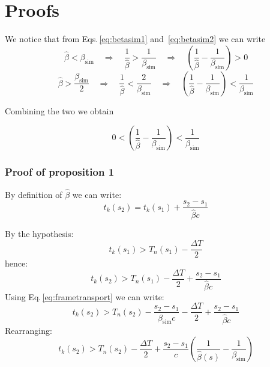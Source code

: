 \section{Proofs}
\label{seq:coasting_proofs}


We notice that from Eqs.\,\ref{eq:betasim1} and~\ref{eq:betasim2} we can write
\begin{equation}
\hat{\beta} < \beta_\text{sim} 
\quad \Rightarrow \quad
\frac{1}{\hat{\beta}} > \frac{1}{\beta_\text{sim}}
\quad \Rightarrow \quad
\left(
\frac{1}{\hat{\beta}} - \frac{1}{\beta_\text{sim}}
\right) > 0
\end{equation}
\begin{equation}
\hat{\beta} > \frac{\beta_\text{sim}}{2} 
\quad \Rightarrow \quad
\frac{1}{\hat{\beta}} < \frac{2}{\beta_\text{sim}}
\quad \Rightarrow \quad
\left(
\frac{1}{\hat{\beta}} - \frac{1}{\beta_\text{sim}}
\right) < \frac{1}{\beta_\text{sim}}
\end{equation}

Combining the two we obtain

\begin{equation}
0<\left(
\frac{1}{\hat{\beta}} - \frac{1}{\beta_\text{sim}}
\right) < \frac{1}{\beta_\text{sim}}
\label{eq:betaineq}
\end{equation}

\subsubsection*{Proof of proposition 1}
By definition of $\hat{\beta}$ we can write:
\begin{equation}
t_k(s_2) = t_k(s_1) + \frac{s_2 - s_1}{\hat{\beta} c} 
\label{eq:tk2fromtk1}
\end{equation}

By the hypothesis:
\begin{equation}
t_k(s_1) > T_n(s_1) - \frac{\Delta T}{2}
\end{equation}
hence:
\begin{equation}
t_k(s_2) > T_n(s_1) - \frac{\Delta T}{2} + \frac{s_2 - s_1}{\hat{\beta} c} 
\end{equation}
Using Eq.\,\ref{eq:frametransport} we can write:
\begin{equation}
t_k(s_2) > T_n(s_2) - \frac{s_2 - s_1}{{\beta}_\text{sim} c}  - \frac{\Delta T}{2} + \frac{s_2 - s_1}{\hat{\beta} c} 
\end{equation}
Rearranging:
\begin{equation}
t_k(s_2) > T_n(s_2) - \frac{\Delta T}{2} + \frac{s_2 - s_1}{c} \left(
\frac{1}{\hat{\beta}(s)} - \frac{1}{\beta_\text{sim}}
\right)
\end{equation}

